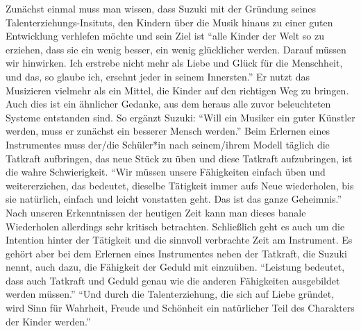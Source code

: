 Zunächst einmal muss man wissen, dass Suzuki mit der Gründung seines
Talenterziehungs-Insituts, den Kindern über die Musik hinaus zu einer guten
Entwicklung verhlefen möchte und sein Ziel ist \enquote{alle Kinder der Welt so
zu erziehen, dass sie ein wenig besser, ein wenig glücklicher werden. Darauf
müssen wir hinwirken. Ich erstrebe nicht mehr als Liebe und Glück für die
Menschheit, und das, so glaube ich, ersehnt jeder in seinem Innersten.}
\autocite[103]{suzuki:erziehung_ist_liebe}
Er nutzt das Musizieren vielmehr als ein Mittel, die Kinder auf den richtigen
Weg zu bringen. Auch dies ist ein ähnlicher Gedanke, aus dem heraus alle zuvor
beleuchteten Systeme entstanden sind. So ergänzt Suzuki: \enquote{Will
ein Musiker ein guter Künstler werden, muss er zunächst ein besserer Mensch
werden.}\autocite[103]{suzuki:erziehung_ist_liebe} Beim Erlernen eines
Instrumentes muss der/die Schüler*in nach seinem/ihrem Modell täglich die
Tatkraft aufbringen, das neue Stück zu üben und diese Tatkraft aufzubringen, ist
die wahre Schwierigkeit. \enquote{Wir müssen unsere Fähigkeiten einfach üben und
weitererziehen, das bedeutet, dieselbe Tätigkeit immer aufs Neue wiederholen,
bis sie natürlich, einfach und leicht vonstatten geht. Das ist das ganze
Geheimnis.}\autocite[57]{suzuki:erziehung_ist_liebe} Nach unseren Erkenntnissen
der heutigen Zeit kann man dieses banale Wiederholen allerdings sehr kritisch
betrachten. Schließlich geht es auch um die Intention hinter der Tätigkeit und
die sinnvoll verbrachte Zeit am Instrument. Es gehört aber bei dem Erlernen
eines Instrumentes neben der Tatkraft, die Suzuki nennt, auch dazu, die
Fähigkeit der Geduld mit einzuüben. \enquote{Leistung bedeutet, dass auch
Tatkraft und Geduld genau wie die anderen Fähigkeiten ausgebildet werden
müssen.}
\autocite[60]{suzuki:erziehung_ist_liebe}
\enquote{Und durch die Talenterziehung, die sich auf Liebe gründet, wird Sinn
für Wahrheit, Freude und Schönheit ein natürlicher Teil des Charakters der
Kinder werden.} \autocite[75]{suzuki:erziehung_ist_liebe}

